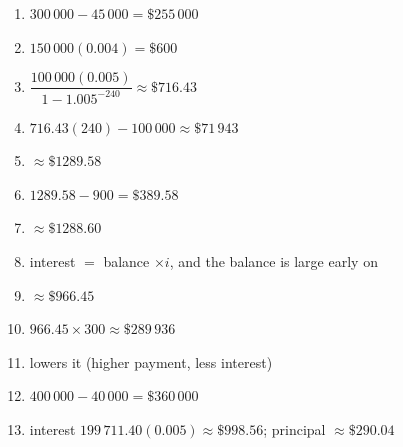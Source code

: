 \documentclass[11pt]{article}
\begin{document}
\begin{keybox}
\begin{multicols}{2}
\small
\begin{enumerate}[leftmargin=*,itemsep=3pt]
  \item $300\,000-45\,000=\$255\,000$
  \item $150\,000(0.004)=\$600$
  \item $\dfrac{100\,000(0.005)}{1-1.005^{-240}}\approx\$716.43$
  \item $716.43(240)-100\,000\approx\$71\,943$
  \item $\approx\$1289.58$
  \item $1289.58-900=\$389.58$
  \item $\approx\$1288.60$
  \item interest $=$ balance $\times i$, and the balance is large early on
  \item $\approx\$966.45$
  \item $966.45\times300\approx\$289\,936$
  \item lowers it (higher payment, less interest)
  \item $400\,000-40\,000=\$360\,000$
  \item interest $199\,711.40(0.005)\approx\$998.56$; principal $\approx\$290.04$
\end{enumerate}
\end{multicols}
\end{keybox}
\end{document}
